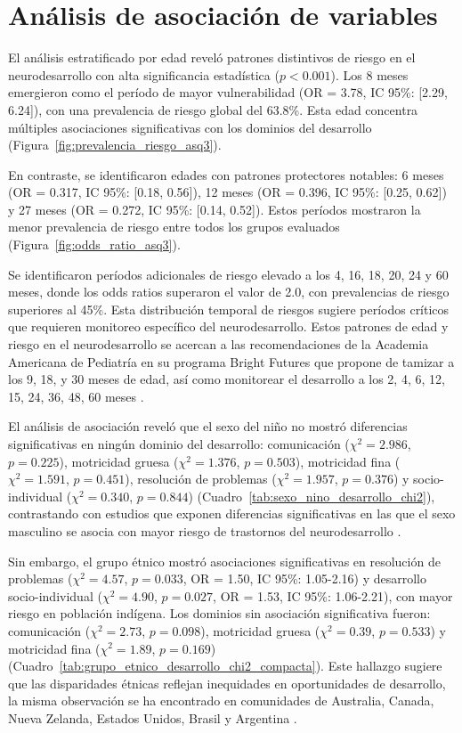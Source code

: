 \documentclass[11pt,letterpaper]{report}
\begin{document}
\section{Análisis de asociación de variables}
El análisis estratificado por edad reveló patrones distintivos de riesgo en el 
neurodesarrollo con alta significancia estadística ($p<0.001$). Los 8 meses 
emergieron como el período de mayor vulnerabilidad (OR = 3.78, IC 95\%: 
[2.29, 6.24]), con una prevalencia de riesgo global del 63.8\%. Esta edad 
concentra múltiples asociaciones significativas con los dominios del desarrollo
(Figura~\ref{fig:prevalencia_riesgo_asq3}).

En contraste, se identificaron edades con patrones protectores notables: 6 meses 
(OR = 0.317, IC 95\%: [0.18, 0.56]), 12 meses (OR = 0.396, IC 95\%: [0.25, 0.62]) 
y 27 meses (OR = 0.272, IC 95\%: [0.14, 0.52]). Estos períodos mostraron la 
menor prevalencia de riesgo entre todos los grupos evaluados
(Figura~\ref{fig:odds_ratio_asq3}).

Se identificaron períodos adicionales de riesgo elevado a los 4, 16, 18, 20, 24 
y 60 meses, donde los odds ratios superaron el valor de 2.0, con prevalencias 
de riesgo superiores al 45\%. Esta distribución temporal de riesgos sugiere 
períodos críticos que requieren monitoreo específico del neurodesarrollo.
Estos patrones de edad y riesgo en el neurodesarrollo se acercan a las
recomendaciones de la Academia Americana de Pediatría en su programa Bright
Futures que propone de tamizar a los 9, 18, y 30 meses de edad, así como monitorear el desarrollo a los 2, 4, 6, 12, 15, 24, 36, 48, 60 meses \cite{Lipkin2020}. 

El análisis de asociación reveló que el sexo del niño no mostró diferencias 
significativas en ningún dominio del desarrollo: comunicación 
($\chi^2 = 2.986$, $p = 0.225$), motricidad gruesa ($\chi^2 = 1.376$, 
$p = 0.503$), motricidad fina ($\chi^2 = 1.591$, $p = 0.451$), resolución 
de problemas ($\chi^2 = 1.957$, $p = 0.376$) y socio-individual 
($\chi^2 = 0.340$, $p = 0.844$) (Cuadro~\ref{tab:sexo_nino_desarrollo_chi2}), 
contrastando con estudios que exponen diferencias significativas en las que
el sexo masculino se asocia con mayor riesgo de trastornos del neurodesarrollo \cite{Sudry2024,Christensen2025,Peyre2019,Nishimura2016}.

Sin embargo, el grupo étnico mostró asociaciones significativas en resolución 
de problemas ($\chi^2 = 4.57$, $p = 0.033$, OR = 1.50, IC 95\%: 1.05-2.16) 
y desarrollo socio-individual ($\chi^2 = 4.90$, $p = 0.027$, OR = 1.53, 
IC 95\%: 1.06-2.21), con mayor riesgo en población indígena. Los dominios sin 
asociación significativa fueron: comunicación ($\chi^2 = 2.73$, $p = 0.098$), 
motricidad gruesa ($\chi^2 = 0.39$, $p = 0.533$) y motricidad fina 
($\chi^2 = 1.89$, $p = 0.169$) 
(Cuadro~\ref{tab:grupo_etnico_desarrollo_chi2_compacta}). Este hallazgo 
sugiere que las disparidades étnicas reflejan inequidades en oportunidades de
desarrollo, la misma observación se ha encontrado en comunidades de Australia, Canada, Nueva Zelanda, Estados Unidos, Brasil y Argentina
\cite{Lau2022,Hanly2020,Wehby2017}.
\end{document}
